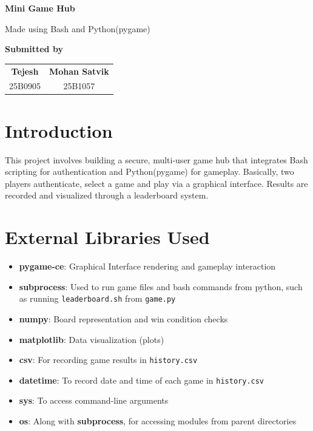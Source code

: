 \documentclass[12pt,a4paper]{article}
\begin{document}
\begin{titlepage}
    \centering
    \vspace*{2cm}
    {\Huge \textbf{Mini Game Hub}\par}
    \vspace{0.5cm}
    {\Large Made using Bash and Python(pygame)\par}
    \vspace{2cm}
    {\Large \textbf{Submitted by}\par}
    \vspace{1cm}
    \begin{tabular}{c c}
    \textbf{Tejesh} & \textbf{Mohan Satvik}
    \\
    25B0905 & 25B1057 \\
    \end{tabular}
    \vfill
\end{titlepage}
\thispagestyle{empty}

\newpage
\tableofcontents
\newpage

\section{Introduction}
This project involves building a secure, multi-user game hub that integrates Bash scripting for authentication and Python(pygame) for gameplay. Basically, two players authenticate, select a game and play via a graphical interface. Results are recorded and visualized through a leaderboard system.

\section{External Libraries Used}
\begin{itemize}
    \item \textbf{pygame-ce}: Graphical Interface rendering and gameplay interaction
    \item \textbf{subprocess}: Used to run game files and bash commands from python, such as running \texttt{leaderboard.sh} from \texttt{game.py}
    \item \textbf{numpy}: Board representation and win condition checks
    \item \textbf{matplotlib}: Data visualization (plots)
    \item \textbf{csv}: For recording game results in \texttt{history.csv}
    \item \textbf{datetime}: To record date and time of each game in \texttt{history.csv}
    \item \textbf{sys}: To access command-line arguments
    \item \textbf{os}: Along with \textbf{subprocess}, for accessing modules from parent directories

\end{itemize}
\end{document}
